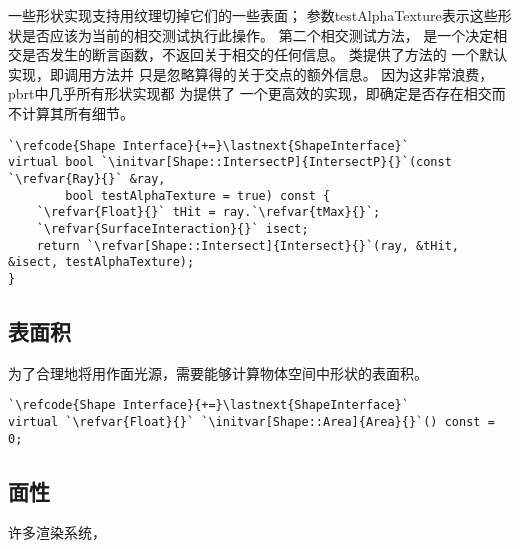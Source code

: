 一些形状实现支持用纹理切掉它们的一些表面；
参数{\ttfamily testAlphaTexture}表示这些形状是否应该为当前的相交测试执行此操作。
第二个相交测试方法，
是一个决定相交是否发生的断言函数，不返回关于相交的任何信息。
类提供了方法的
一个默认实现，即调用方法并
只是忽略算得的关于交点的额外信息。
因为这非常浪费，pbrt中几乎所有形状实现都
为提供了
一个更高效的实现，即确定是否存在相交而不计算其所有细节。
\begin{lstlisting}
`\refcode{Shape Interface}{+=}\lastnext{ShapeInterface}`
virtual bool `\initvar[Shape::IntersectP]{IntersectP}{}`(const `\refvar{Ray}{}` &ray,
        bool testAlphaTexture = true) const {
    `\refvar{Float}{}` tHit = ray.`\refvar{tMax}{}`;
    `\refvar{SurfaceInteraction}{}` isect;
    return `\refvar[Shape::Intersect]{Intersect}{}`(ray, &tHit, &isect, testAlphaTexture);
}
\end{lstlisting}

\subsection{表面积}\label{sub:表面积}
为了合理地将用作面光源，需要能够计算物体空间中形状的表面积。
\begin{lstlisting}
`\refcode{Shape Interface}{+=}\lastnext{ShapeInterface}`
virtual `\refvar{Float}{}` `\initvar[Shape::Area]{Area}{}`() const = 0;
\end{lstlisting}

\subsection{面性}\label{sub:面性}
许多渲染系统，